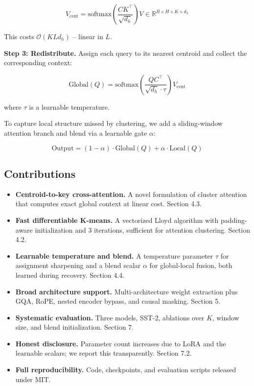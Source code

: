 \[
V_{\text{cent}} = \text{softmax}\!\left(\frac{C K^\top}{\sqrt{d_h}}\right) V \in \mathbb{R}^{B \times H \times K \times d_h}
\]

This costs $\mathcal{O}(K L d_h)$ -- linear in $L$.

\textbf{Step 3: Redistribute.} Assign each query to its nearest centroid and 
collect the corresponding context:

\[
\text{Global}(Q) = \text{softmax}\!\left(\frac{Q C^\top}{\sqrt{d_h} \cdot \tau}\right) V_{\text{cent}}
\]

where $\tau$ is a learnable temperature.

To capture local structure missed by clustering, we add a sliding-window 
attention branch and blend via a learnable gate $\alpha$:

\[
\text{Output} = (1 - \alpha) \cdot \text{Global}(Q) + \alpha \cdot \text{Local}(Q)
\]

\subsection{Contributions}

\begin{itemize}
\item \textbf{Centroid-to-key cross-attention.} A novel formulation of cluster
  attention that computes exact global context at linear cost. Section 4.3.
\item \textbf{Fast differentiable K-means.} A vectorized Lloyd algorithm with
  padding-aware initialization and 3 iterations, sufficient for attention
  clustering. Section 4.2.
\item \textbf{Learnable temperature and blend.} A temperature parameter $\tau$ for
  assignment sharpening and a blend scalar $\alpha$ for global-local fusion,
  both learned during recovery. Section 4.4.
\item \textbf{Broad architecture support.} Multi-architecture weight extraction plus
  GQA, RoPE, nested encoder bypass, and causal masking. Section 5.
\item \textbf{Systematic evaluation.} Three models, SST-2, ablations over $K$,
  window size, and blend initialization. Section 7.
\item \textbf{Honest disclosure.} Parameter count increases due to LoRA and the
  learnable scalars; we report this transparently. Section 7.2.
\item \textbf{Full reproducibility.} Code, checkpoints, and evaluation scripts
  released under MIT.

\end{itemize}
